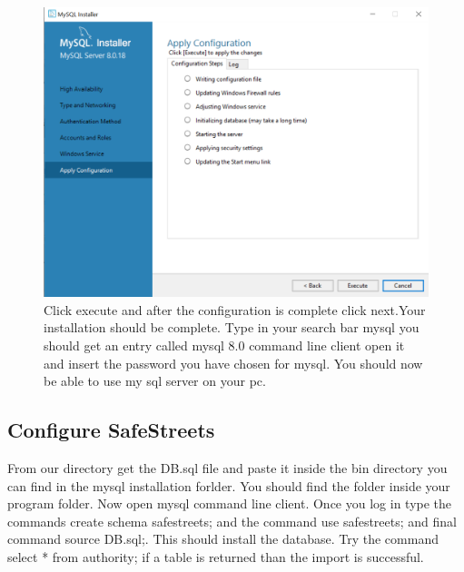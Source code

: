 \begin{figure}[h]
\centering
\includegraphics[width=\textwidth]{Images/7-mysql.png}
\caption{\label{fig:fmy} Click execute and after the configuration is complete click next.Your installation should be complete.
Type in your search bar mysql you should get an entry called mysql 8.0 command line client open it and insert the password you have chosen for mysql. You should now be able to use my sql server on your pc.}
\end{figure}


\clearpage
\subsection{Configure SafeStreets}
From our directory get the DB.sql file and paste it inside the bin directory you can find in the mysql installation forlder.
You should find the folder inside your program folder.
Now open mysql command line client. Once you log in type the commands create schema safestreets; and the command 
use safestreets; and final command source DB.sql;.
This should install the database. Try the command select * from authority; if a table is returned than the import is successful.


